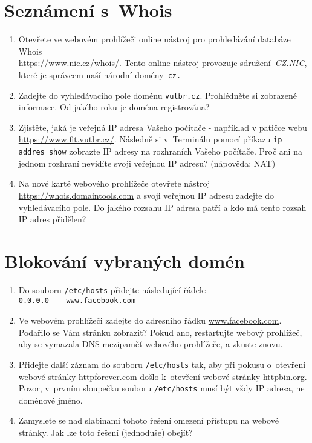 \section{Seznámení s~Whois}
\begin{enumerate}
    \item Otevřete ve webovém prohlížeči online nástroj pro prohledávání databáze Whois\\ \url{https://www.nic.cz/whois/}. Tento online nástroj provozuje sdružení~\emph{CZ.NIC}, které je správcem naší národní domény~\texttt{cz.}
    \item Zadejte do vyhledávacího pole doménu \texttt{vutbr.cz}. Prohlédněte si zobrazené informace. Od jakého roku je doména registrována?
    \item Zjistěte, jaká je veřejná IP adresa Vašeho počítače - například v patičce webu \url{https://www.fit.vutbr.cz/}. Následně si v~Terminálu pomocí příkazu \texttt{ip addres show} zobrazte IP adresy na rozhraních Vašeho počítače. Proč ani na jednom rozhraní nevidíte svoji veřejnou IP adresu? (nápověda: NAT)
    \item Na nové kartě webového prohlížeče otevřete nástroj \url{https://whois.domaintools.com} a svoji veřejnou IP adresu zadejte do vyhledávacího pole. Do jakého rozsahu IP adresa patří a kdo má tento rozsah IP adres přidělen?
\end{enumerate}

\section{Blokování vybraných domén}
\begin{enumerate}
	\item Do souboru \texttt{/etc/hosts} přidejte následující řádek:\\
    \verb|0.0.0.0    www.facebook.com|
    \item Ve webovém prohlížeči zadejte do adresního řádku \url{www.facebook.com}. Podařilo se Vám stránku zobrazit? Pokud ano, restartujte webový prohlížeč, aby se vymazala DNS mezipaměť webového prohlížeče, a zkuste znovu.
    \item Přidejte další záznam do souboru \texttt{/etc/hosts} tak, aby při pokusu o~otevření webové stránky \url{httpforever.com} došlo k~otevření webové stránky \url{httpbin.org}. Pozor, v~prvním sloupečku souboru \texttt{/etc/hosts} musí být vždy IP adresa, ne doménové jméno.
    \item Zamyslete se nad slabinami tohoto řešení omezení přístupu na webové stránky. Jak lze toto řešení (jednoduše) obejít?
\end{enumerate}

